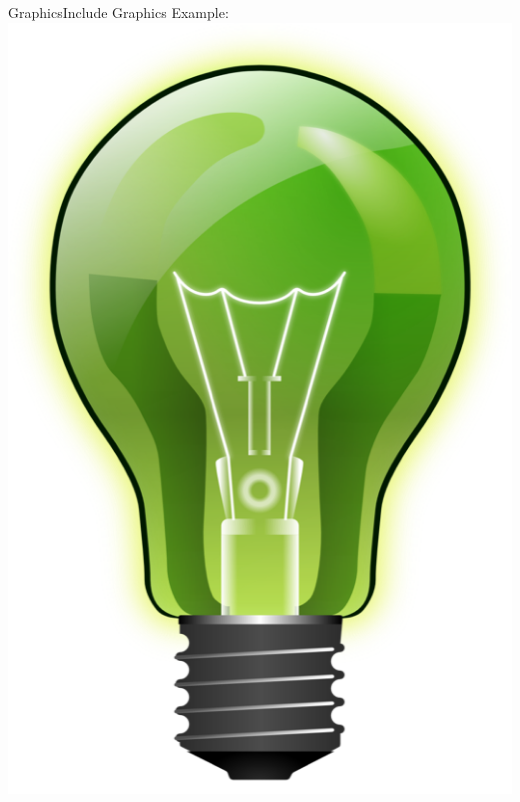 \documentclass{bredelebeamer}
\begin{document}
\begin{frame}[fragile]{Graphics}{Include Graphics}
\alert{Example:} 
\texttt{\includegraphics[scale=0.2]{images/bulb}}
\begin{center}

\end{center}
\end{frame}
\end{document}

